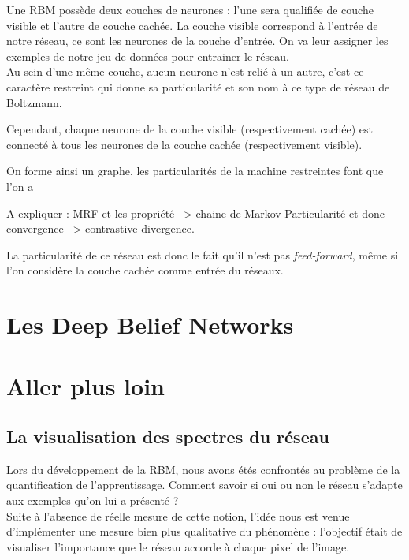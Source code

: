 \documentclass[a4paper,twoside]{report}
\begin{document}
                Une RBM possède deux couches de neurones : l'une sera qualifiée de couche visible et l'autre de couche cachée.
                La couche visible correspond à l'entrée de notre réseau, ce sont les neurones de la couche d'entrée. On va leur assigner les exemples de notre jeu de données pour entrainer le réseau.\\

                Au sein d'une même couche, aucun neurone n'est relié à un
                autre, c'est ce caractère restreint qui donne sa particularité et son nom à ce type de réseau de Boltzmann.

                Cependant, chaque neurone de la couche visible (respectivement cachée) est connecté à tous les neurones de la couche cachée
                (respectivement visible).

                On forme ainsi un graphe, les particularités de la machine restreintes font que
                l'on a 

                A expliquer : MRF et les propriété --> chaine de Markov
                Particularité et donc convergence --> contrastive divergence.

                La particularité de ce réseau est donc le fait qu'il n'est pas
                \textit{feed-forward}, même si l'on considère la couche cachée comme entrée du
                réseaux.



        \chapter{Les Deep Belief Networks}



        \chapter{Aller plus loin}

            \section{La visualisation des spectres du réseau}

                Lors du développement de la RBM, nous avons étés confrontés au problème de la quantification de l'apprentissage. Comment savoir si oui ou non le réseau s'adapte aux exemples qu'on lui a présenté ?\\

                Suite à l'absence de réelle mesure de cette notion, l'idée nous est venue d'implémenter une mesure bien plus qualitative du phénomène : l'objectif était de visualiser l'importance que le réseau accorde à chaque pixel de l'image.\\
\end{document}
